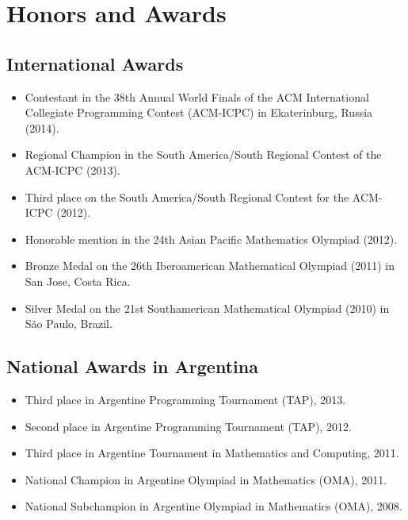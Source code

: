 \documentclass [a4paper, 11pt]{article}
\begin{document}
\section* {Honors and Awards}

\subsection* {International Awards}

\begin{itemize} \itemsep.05cm
	\item[] Contestant in the 38th Annual World Finals of the ACM International Collegiate Programming Contest (ACM-ICPC) in Ekaterinburg, Russia (2014).
	\item[] Regional Champion in the South America/South Regional Contest of the ACM-ICPC (2013).
	\item[] Third place on the South America/South Regional Contest for the ACM-ICPC (2012).
	\item[] Honorable mention in the 24th Asian Pacific Mathematics Olympiad (2012).
	\item[] Bronze Medal on the 26th Iberoamerican Mathematical Olympiad (2011) in San Jose, Costa Rica.
	\item[] Silver Medal on the 21st Southamerican Mathematical Olympiad (2010) in S\~ao Paulo, Brazil. %


\end{itemize}

\subsection* {National Awards in Argentina}

\begin{itemize} \itemsep.05cm
	\item[] Third place in Argentine Programming Tournament (TAP), 2013.
	\item[] Second place in Argentine Programming Tournament (TAP), 2012.
	\item[] Third place in Argentine Tournament in Mathematics and Computing, 2011.
	\item[] National Champion in Argentine Olympiad in Mathematics (OMA), 2011.
	\item[] National Subchampion in Argentine Olympiad in Mathematics (OMA), 2008.
	
\end{itemize}
\end{document}
